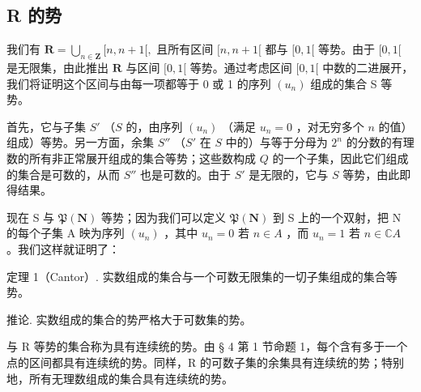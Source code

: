 \subsection{R 的势}

我们有 \(\mathbf{R} = \bigcup_{n\in \mathbf{Z}}[n,n + 1[,\) 且所有区间 \([n,n + 1[\) 都与 \([0,1[\) 等势。由于 \([0,1[\) 是无限集，由此推出 \(\mathbf{R}\) 与区间 \([0,1[\) 等势。通过考虑区间 \([0,1[\) 中数的二进展开，我们将证明这个区间与由每一项都等于 0 或 1 的序列 \((u_n)\) 组成的集合 S 等势。

首先，它与子集 \(S'\) （\(S\) 的，由序列 \((u_n)\) （满足 \(u_n = 0\) ，对无穷多个 \(n\) 的值）组成）等势。另一方面，余集 \(S''\) （\(S'\) 在 \(S\) 中的）与等于分母为 \(2^n\) 的分数的有理数的所有非正常展开组成的集合等势；这些数构成 \(Q\) 的一个子集，因此它们组成的集合是可数的，从而 \(S''\) 也是可数的。由于 \(S'\) 是无限的，它与 \(S\) 等势，由此即得结果。

现在 S 与 \(\mathfrak{P}(\mathbf{N})\) 等势；因为我们可以定义 \(\mathfrak{P}(\mathbf{N})\) 到 S 上的一个双射，把 N 的每个子集 A 映为序列 \((u_n)\) ，其中 \(u_n = 0\) 若 \(n \in A\) ，而 \(u_n = 1\) 若 \(n \in \mathbb{C}A\) 。我们这样就证明了：

定理 1（Cantor）. 实数组成的集合与一个可数无限集的一切子集组成的集合等势。

推论. 实数组成的集合的势严格大于可数集的势。

与 R 等势的集合称为具有连续统的势。由 § 4 第 1 节命题 1，每个含有多于一个点的区间都具有连续统的势。同样，R 的可数子集的余集具有连续统的势；特别地，所有无理数组成的集合具有连续统的势。

